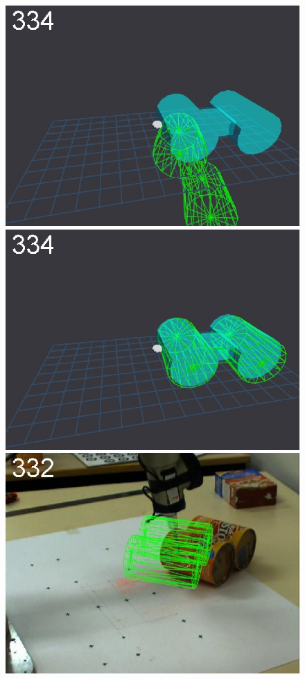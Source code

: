 \begin{figure}[t]
{\includegraphics[width=\imgCXwid]{./C5_2exp_6_5}
\includegraphics[width=\imgCXwid]{./C5_3exp_6_5}
\includegraphics[width=\imgCXwid]{./C2_3exp_75_5}
}
\end{figure}

